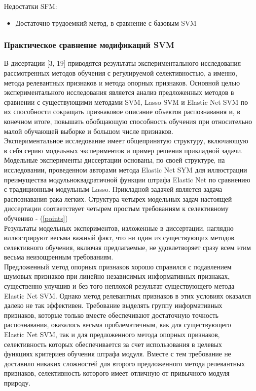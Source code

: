 \documentclass[12pt,a4paper]{article}
\begin{document}
Недостатки SFM:
\begin{itemize}
	\item Достаточно трудоемкий метод, в сравнение с базовым SVM
\end{itemize}

\subsubsection{Практическое сравнение модификаций SVM}
В дисертации [3, 19] приводятся результаты экспериментального исследования рассмотренных методов обучения с регулируемой селективностью, а именно, метода релевантных признаков и метода опорных признаков. Основной целью экспериментального исследования является анализ предложенных методов в сравнении с существующими методами SVM, Lasso SVM и Elastic Net SVM по их способности
сокращать признаковое описание объектов распознавания и, в конечном итоге, повышать
обобщающую способность обучения при относительно малой обучающей выборке и
большом числе признаков.
\\


Экспериментальное исследование имеет общепринятую структуру, включающую в себя серию модельных экспериментов и пример решения прикладной задачи. \\
Модельные
эксперименты диссертации основаны, по своей структуре, на исследовании, проведенном
авторами метода Elastic Net SYM для иллюстрации преимущества модульноквадратичной функции штрафа Elastic Net по сравнению с традиционным модульным Lasso. Прикладной задачей является задача распознавания рака легких.
Структура четырех модельных задач настоящей диссертации соответствует
четырем простым требованиям к селективному обучению - (\ref{points})\\ Результаты модельных экспериментов, изложенные в диссертации, наглядно иллюстрируют весьма важный факт, что ни один из существующих методов селективного обучения, включая предлагаемые, не удовлетворяет сразу всем этим весьма неизощренным
требованиям. 
\\

Предложенный метод опорных признаков хорошо справился с подавлением шумовых признаков при линейно независимых информативных признаках, существенно улучшив и без того неплохой результат существующего метода Elastic Net
SVM. Однако метод релевантных признаков в этих условиях оказался далеко не так эффективен. Требование выделять группу информативных признаков, которые только
вместе обеспечивают достаточную точность распознавания, оказалось весьма проблематичным, как для существующего Elastic Net SVM, так и для предложенного метода
опорных признаков, селективность которых обеспечивается за счет использования в целевых функциях критериев обучения штрафа модуля. Вместе с тем требование не доставило никаких сложностей для второго предложенного метода релевантных признаков, селективность которого имеет отличную от привычного модуля природу.
\\
\end{document}
